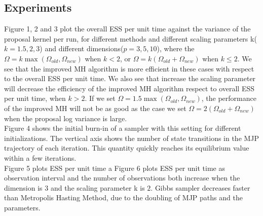 \subsection{Experiments}
Figure 1, 2 and 3 plot the overall  ESS per unit time against the variance of the proposal kernel per run, for different methods and different scaling parameters k($k = 1.5, 2, 3$) and different dimensions($p = 3, 5, 10$), where the  $\Omega = k \max(\Omega_{old}, \Omega_{new})$ when $k < 2$, or $\Omega = k (\Omega_{old} + \Omega_{new})$ when $k \leq 2$. We see that the improved MH algorithm is more efficient in these cases with respect to the overall ESS per unit time. We also see that increase the scaling parameter will decrease the efficiency of the improved MH algorithm respect to overall ESS per unit time, when $k > 2$. If we set $\Omega = 1.5 \max(\Omega_{old}, \Omega_{new})$, the performance of the improved MH will not be as good as the case we set $\Omega = 2(\Omega_{old} + \Omega_{new})$ when the proposal log variance is large.\\
Figure 4 shows the initial burn-in of a sampler with this setting for different initializations. The vertical axis shows the number of state transitions in the MJP trajectory of each iteration. This quantity quickly reaches its equilibrium value within a few iterations.\\

Figure 5 plots ESS per unit time a
Figure 6 plots ESS per unit time as observation interval and the number of observations both increase when the dimension is $3$ and the scaling parameter k is $2$. Gibbs sampler decreases faster than Metropolis Hasting Method, due to the doubling of MJP paths and the parameters. \\


